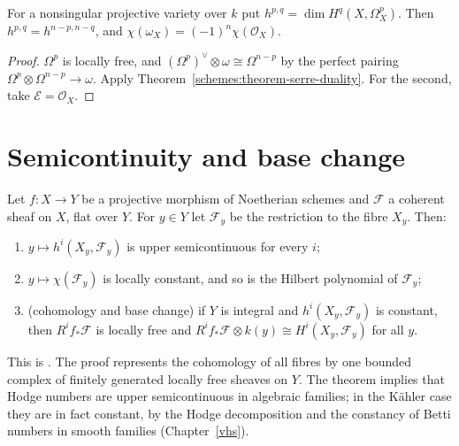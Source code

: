 \begin{corollary}\label{schemes:corollary-hodge-symmetry-serre}
For a nonsingular projective variety over $k$ put $h^{p,q} = \dim H^q(X, \Omega^p_X)$. Then $h^{p,q} = h^{n-p,n-q}$, and $\chi(\omega_X) = (-1)^n\chi(\mathcal{O}_X)$.
\end{corollary}

\begin{proof}
$\Omega^p$ is locally free, and $(\Omega^p)^\vee \otimes \omega \cong \Omega^{n-p}$ by the perfect pairing $\Omega^p \otimes \Omega^{n-p} \to \omega$. Apply
Theorem~\ref{schemes:theorem-serre-duality}. For the second, take $\mathcal{E} = \mathcal{O}_X$.
\end{proof}

\section{Semicontinuity and base change}\label{schemes:section-base-change-coherent-cohomology}

\begin{theorem}[Semicontinuity]\label{schemes:theorem-semicontinuity}
Let $f \colon X \to Y$ be a projective morphism of Noetherian schemes and $\mathcal{F}$ a coherent sheaf on $X$, flat over $Y$. For $y \in Y$ let
$\mathcal{F}_y$ be the restriction to the fibre $X_y$. Then:
\begin{enumerate}
\item $y \mapsto h^i(X_y, \mathcal{F}_y)$ is upper semicontinuous for every $i$;
\item $y \mapsto \chi(\mathcal{F}_y)$ is locally constant, and so is the Hilbert polynomial of $\mathcal{F}_y$;
\item (cohomology and base change) if $Y$ is integral and $h^i(X_y, \mathcal{F}_y)$ is constant, then $R^if_*\mathcal{F}$ is locally free and
$R^if_*\mathcal{F} \otimes k(y) \cong H^i(X_y, \mathcal{F}_y)$ for all $y$.
\end{enumerate}
\end{theorem}

This is \cite[Theorem III.12.8, Corollary III.12.9 and Theorem III.9.9]{hartshorne-ag}. The proof represents the cohomology of all fibres by one bounded complex
of finitely generated locally free sheaves on $Y$. The theorem implies that Hodge numbers are upper semicontinuous in algebraic families; in the
K\"ahler case they are in fact constant, by the Hodge decomposition and the constancy of Betti numbers in smooth families (Chapter~\ref{vhs}).

